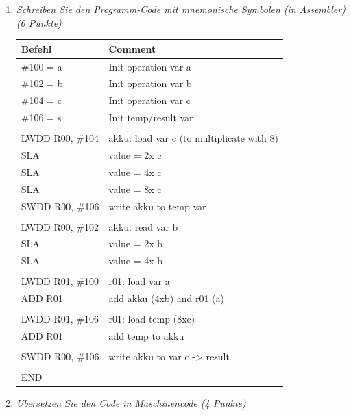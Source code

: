 \documentclass[10pt]{article}
\begin{document}
\begin{enumerate}[label=\alph*)]
	\item
		\textit{Schreiben Sie den Programm-Code mit mnemonische Symbolen (in Assembler) (6 Punkte)}
		
		\begin{tabular}[h]{l | l}
			\textbf{Befehl} & \textbf{Comment}\\
			\hline
			\#100 = a & Init operation var a\\
			\#102 = b & Init operation var b\\
			\#104 = c & Init operation var c\\
			\#106 = s & Init temp/result var \\
			& \\
			LWDD R00, \#104 & akku: load var c (to multiplicate with 8)\\
			SLA & value = 2x c \\ %
			SLA & value = 4x c\\
			SLA & value = 8x c\\
			SWDD R00, \#106 & write akku to temp var\\
			& \\
			LWDD R00, \#102 & akku: read var b \\
			SLA & value = 2x b\\
			SLA & value = 4x b\\
			& \\
			LWDD R01, \#100 & r01: load var a\\ %
			ADD R01 & add akku (4xb) and r01 (a)\\
			& \\
			LWDD R01, \#106	 & r01: load temp (8xc) \\
			ADD R01 & add temp to akku \\
			& \\
			SWDD R00, \#106 & write akku to var c -> result\\
			& \\
			END & \\
			
		\end{tabular}

	\item
			\textit{Übersetzen Sie den Code in Maschinencode (4 Punkte)}
			

\end{enumerate}
\end{document}
